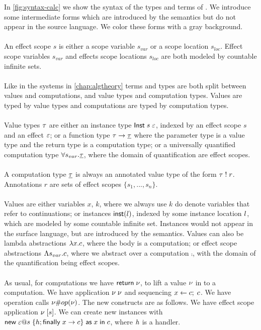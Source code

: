 {In \cref{fig:syntax-calc} we show the syntax of the types and terms of \lang{}.
We introduce some intermediate forms which are introduced by the semantics but do not appear in the source language.
We color these forms with a gray background.
\\\\
An effect scope $s$ is either a scope variable $s_{var}$ or a scope location $s_{loc}$.
Effect scope variables $s_{var}$ and effects scope locations $s_{loc}$ are both modeled by countable infinite sets.
\\\\
Like in the systems in \cref{chap:algtheory} terms and types are both split between values and computations, and value types and computation types.
Values are typed by value types and computations are typed by computation types.
\\\\
Value types $\tau$ are either an instance type $\mathsf{Inst} \; s \; \varepsilon$, indexed by an effect scope $s$ and an effect $\varepsilon$;
or a function type $\tau \rightarrow \underline{\tau}$ where the parameter type is a value type and the return type is a computation type;
or a universally quantified computation type $\forall s_{var} . \underline{\tau}$, where the domain of quantification are effect scopes.
\\\\
A computation type $\underline{\tau}$ is always an annotated value type of the form $\tau \; ! \; r$.
Annotations $r$ are sets of effect scopes $\{ s_1, ..., s_n \}$.
\\\\
Values are either variables $x$, $k$, where we always use $k$ do denote variables that refer to continuations;
or instances $\mathsf{inst}(l)$, indexed by some instance location $l$, which are modeled by some countable infinite set.
Instances would not appear in the surface language, but are introduced by the semantics.
Values can also be lambda abstractions $\lambda x . c$, where the body is a computation;
or effect scope abstractions $\Lambda s_{var} . c$, where we abstract over a computation $\comp$, with the domain of the quantification being effect scopes.
\\\\
As usual, for computations we have $\mathsf{return} \; \nu$, to lift a value $\nu$ in to a computation.
We have application $\nu \; \nu$ and sequencing $x \leftarrow c ;\; c$.
We have operation calls $\nu \# op(\nu)$.
The new constructs are as follows.
We have effect scope application $\nu \; [ s ]$.
We can create new instances with $\mathsf{new} \; \varepsilon @ s \; \{ h ; \mathsf{finally} \; x \rightarrow c \} \; \mathsf{as} \; x \;\mathsf{in}\; c$, where $h$ is a handler.
}
